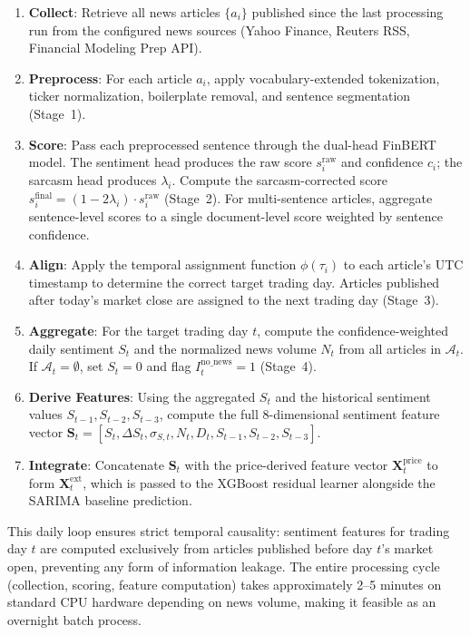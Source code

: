 \documentclass[12pt,a4paper]{article}
\begin{document}
\begin{enumerate}
    \item \textbf{Collect}: Retrieve all news articles $\{a_i\}$ published since the last processing run from the configured news sources (Yahoo Finance, Reuters RSS, Financial Modeling Prep API).
    \item \textbf{Preprocess}: For each article $a_i$, apply vocabulary-extended tokenization, ticker normalization, boilerplate removal, and sentence segmentation (Stage~1).
    \item \textbf{Score}: Pass each preprocessed sentence through the dual-head FinBERT model. The sentiment head produces the raw score $s_i^{\text{raw}}$ and confidence $c_i$; the sarcasm head produces $\lambda_i$. Compute the sarcasm-corrected score $s_i^{\text{final}} = (1 - 2\lambda_i) \cdot s_i^{\text{raw}}$ (Stage~2). For multi-sentence articles, aggregate sentence-level scores to a single document-level score weighted by sentence confidence.
    \item \textbf{Align}: Apply the temporal assignment function $\phi(\tau_i)$ to each article's UTC timestamp to determine the correct target trading day. Articles published after today's market close are assigned to the next trading day (Stage~3).
    \item \textbf{Aggregate}: For the target trading day $t$, compute the confidence-weighted daily sentiment $S_t$ and the normalized news volume $N_t$ from all articles in $\mathcal{A}_t$. If $\mathcal{A}_t = \emptyset$, set $S_t = 0$ and flag $I_t^{\text{no\_news}} = 1$ (Stage~4).
    \item \textbf{Derive Features}: Using the aggregated $S_t$ and the historical sentiment values $S_{t-1}, S_{t-2}, S_{t-3}$, compute the full 8-dimensional sentiment feature vector $\mathbf{S}_t = [S_t, \Delta S_t, \sigma_{S,t}, N_t, D_t, S_{t-1}, S_{t-2}, S_{t-3}]$.
    \item \textbf{Integrate}: Concatenate $\mathbf{S}_t$ with the price-derived feature vector $\mathbf{X}_t^{\text{price}}$ to form $\mathbf{X}_t^{\text{ext}}$, which is passed to the XGBoost residual learner alongside the SARIMA baseline prediction.
\end{enumerate}

This daily loop ensures strict temporal causality: sentiment features for trading day $t$ are computed exclusively from articles published before day $t$'s market open, preventing any form of information leakage. The entire processing cycle (collection, scoring, feature computation) takes approximately 2--5 minutes on standard CPU hardware depending on news volume, making it feasible as an overnight batch process.
\end{document}
